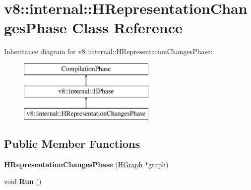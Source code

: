 \hypertarget{classv8_1_1internal_1_1_h_representation_changes_phase}{}\section{v8\+:\+:internal\+:\+:H\+Representation\+Changes\+Phase Class Reference}
\label{classv8_1_1internal_1_1_h_representation_changes_phase}
Inheritance diagram for v8\+:\+:internal\+:\+:H\+Representation\+Changes\+Phase\+:\begin{figure}[H]
\begin{center}
\leavevmode
\includegraphics[height=3.000000cm]{classv8_1_1internal_1_1_h_representation_changes_phase}
\end{center}
\end{figure}
\subsection*{Public Member Functions}
\begin{DoxyCompactItemize}
\item 
{\bfseries H\+Representation\+Changes\+Phase} (\hyperlink{classv8_1_1internal_1_1_h_graph}{H\+Graph} $\ast$graph)\hypertarget{classv8_1_1internal_1_1_h_representation_changes_phase_a1398be8a4e72282dabf2ebbe93a48f5b}{}\label{classv8_1_1internal_1_1_h_representation_changes_phase_a1398be8a4e72282dabf2ebbe93a48f5b}

\item 
void {\bfseries Run} ()\hypertarget{classv8_1_1internal_1_1_h_representation_changes_phase_a097d0c06bf0396fb0bfaeb93d7386089}{}\label{classv8_1_1internal_1_1_h_representation_changes_phase_a097d0c06bf0396fb0bfaeb93d7386089}

\end{DoxyCompactItemize}
